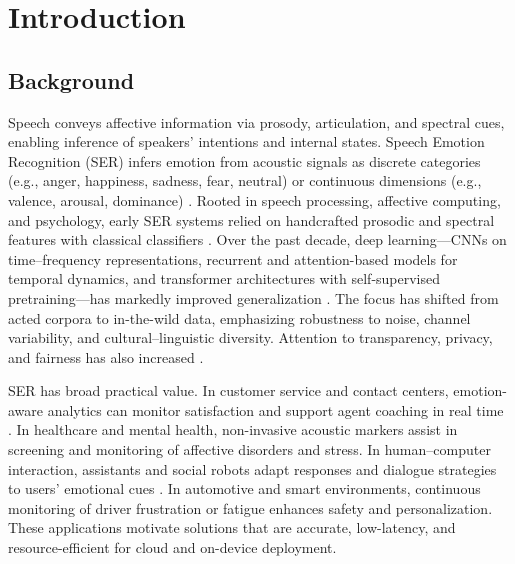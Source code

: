 
\chapter{Introduction}


\section{Background}Speech conveys affective information via prosody, articulation, and spectral cues, enabling inference of speakers’ intentions and internal states. Speech Emotion Recognition (SER) infers emotion from acoustic signals as discrete categories (e.g., anger, happiness, sadness, fear, neutral) or continuous dimensions (e.g., valence, arousal, dominance) \cite{el2011survey}.
Rooted in speech processing, affective computing, and psychology, early SER systems relied on handcrafted prosodic and spectral features with classical classifiers \cite{han2014dnnser}. Over the past decade, deep learning—CNNs on time–frequency representations, recurrent and attention-based models for temporal dynamics, and transformer architectures with self-supervised pretraining—has markedly improved generalization \cite{han2014dnnser,trigeorgis2016adieu,satt2017spectrogram,gong2021ast,baevski2020wav2vec}. The focus has shifted from acted corpora to in-the-wild data, emphasizing robustness to noise, channel variability, and cultural–linguistic diversity. Attention to transparency, privacy, and fairness has also increased \cite{grill2022attitudes}.

SER has broad practical value. In customer service and contact centers, emotion-aware analytics can monitor satisfaction and support agent coaching in real time \cite{rokhsaritalemi2023exploring}.
In healthcare and mental health, non-invasive acoustic markers assist in screening and monitoring of affective disorders and stress. In human–computer interaction, assistants and social robots adapt responses and dialogue strategies to users’ emotional cues \cite{esposito2015needs}. In automotive and smart environments, continuous monitoring of driver frustration or fatigue enhances safety and personalization. These applications motivate solutions that are accurate, low-latency, and resource-efficient for cloud and on-device deployment.

